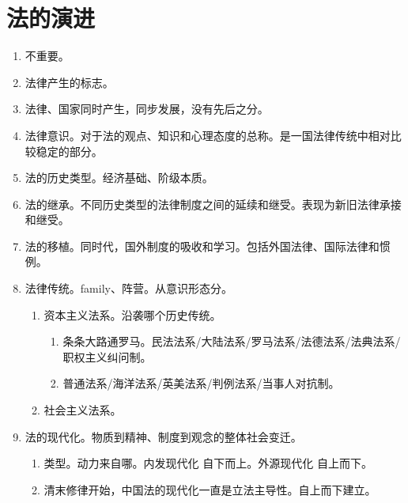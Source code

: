 \section{法的演进}
\begin{enumerate}
  \item 不重要。
  \item 法律产生的标志。
  \item 法律、国家同时产生，同步发展，没有先后之分。
  \item 法律意识。对于法的观点、知识和心理态度的总称。是一国法律传统中相对比较稳定的部分。
  \item 法的历史类型。经济基础、阶级本质。
  \item 法的继承。不同历史类型的法律制度之间的延续和继受。表现为新旧法律承接和继受。
  \item 法的移植。同时代，国外制度的吸收和学习。包括外国法律、国际法律和惯例。
  \item 法律传统。family、阵营。从意识形态分。
        \begin{enumerate}
          \item 资本主义法系。沿袭哪个历史传统。
                \begin{enumerate}
                  \item 条条大路通罗马。民法法系/大陆法系/罗马法系/法德法系/法典法系/职权主义纠问制。
                  \item 普通法系/海洋法系/英美法系/判例法系/当事人对抗制。
                \end{enumerate}
          \item 社会主义法系。
        \end{enumerate}
  \item 法的现代化。物质到精神、制度到观念的整体社会变迁。
        \begin{enumerate}
          \item 类型。动力来自哪。内发现代化 \yjt 自下而上。外源现代化 \yjt 自上而下。
          \item 清末修律开始，中国法的现代化一直是立法主导性。自上而下建立。
        \end{enumerate}
\end{enumerate}

